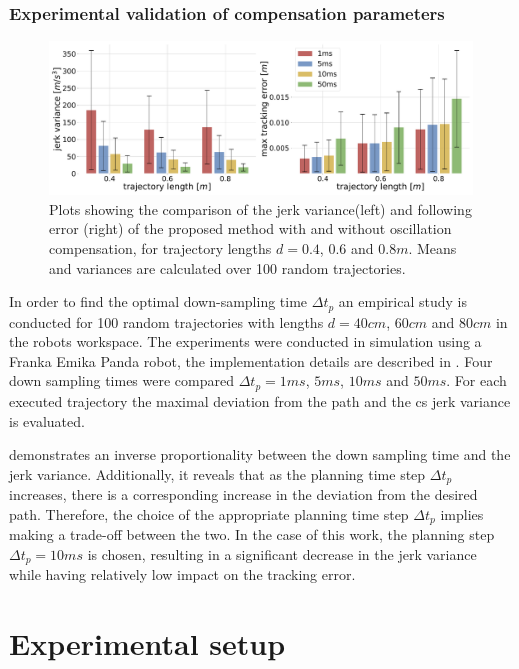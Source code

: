 \subsubsection*{Experimental validation of compensation parameters} 
\begin{figure}[!h]
    \centering
    \includegraphics[width=\linewidth]{Papers/imgs/compensation_comp_oscillations.pdf}
    \caption{Plots showing the comparison of the jerk variance(left) and following error (right) of the proposed method with and without oscillation compensation, for trajectory lengths $d=0.4$, $0.6$ and $0.8m$. Means and variances are calculated over 100 random trajectories. }
    \label{fig:compensatiopn_comp_oscillations}
\end{figure}
In order to find the optimal down-sampling time $\Delta t_p$ an empirical study is conducted for 100 random trajectories with lengths $d=40cm$, $60cm$ and $80cm$ in the robots workspace. The experiments were conducted in simulation using a Franka Emika Panda robot, the implementation details are described in . Four down sampling times were compared $\Delta t_p =1ms$, $5ms$, $10ms$ and $50ms$. For each executed trajectory the maximal deviation from the path and the \gls{cs} jerk variance is evaluated. 

 demonstrates an inverse proportionality between the down sampling time and the jerk variance. Additionally, it reveals that as the planning time step $\Delta t_p$ increases, there is a corresponding increase in the deviation from the desired path. Therefore, the choice of the appropriate planning time step $\Delta t_p$ implies making a trade-off between the two. In the case of this work, the planning step $\Delta t_p=10ms$ is chosen, resulting in a significant decrease in the jerk variance while having relatively low impact on the tracking error.



\section{Experimental setup}
\label{ch:setup}


